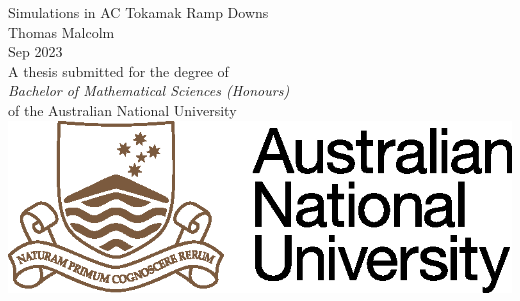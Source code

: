\begin{titlepage}
\begin{center}

\vspace*{\fill} \Huge
                        Simulations in AC Tokamak Ramp Downs
\\
\vfill\vfill\Large
                          Thomas Malcolm
\\
\vfill\vfill
                          Sep 2023
\\
\vfill\vfill \normalsize
         A thesis submitted for the degree of \\
         \emph{Bachelor of Mathematical Sciences (Honours)} \\
         of the Australian National University
\vfill
         \includegraphics{ANU.eps}

\end{center}

\end{titlepage}
